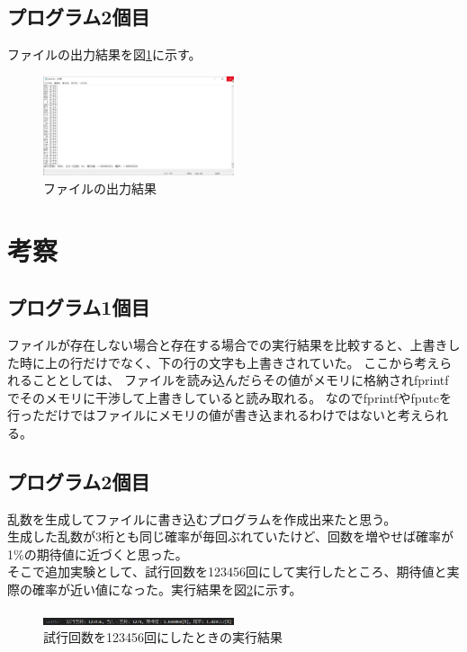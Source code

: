 \documentclass[dvipdfmx]{jsarticle}
\begin{document}
\newpage
\subsection{プログラム2個目}
ファイルの出力結果を図\ref{fig:result_pr2}に示す。\\

\begin{figure}[ht]
  \centering
  \includegraphics[width=0.5\textwidth]{./img/result_pr2.png}
  \caption{ファイルの出力結果}
  \label{fig:result_pr2}
\end{figure}





\section{考察}
\subsection{プログラム1個目}
ファイルが存在しない場合と存在する場合での実行結果を比較すると、上書きした時に上の行だけでなく、下の行の文字も上書きされていた。
ここから考えられることとしては、
ファイルを読み込んだらその値がメモリに格納されfprintfでそのメモリに干渉して上書きしていると読み取れる。
なのでfprintfやfputcを行っただけではファイルにメモリの値が書き込まれるわけではないと考えられる。
\subsection{プログラム2個目}
乱数を生成してファイルに書き込むプログラムを作成出来たと思う。\\
生成した乱数が3桁とも同じ確率が毎回ぶれていたけど、回数を増やせば確率が1\%の期待値に近づくと思った。\\
そこで追加実験として、試行回数を123456回にして実行したところ、期待値と実際の確率が近い値になった。実行結果を図\ref{fig:result_pr2_123456}に示す。\\
\begin{figure}[ht]
  \centering
  \includegraphics[width=0.5\textwidth]{./img/result_pr2_123456.png}
  \caption{試行回数を123456回にしたときの実行結果}
  \label{fig:result_pr2_123456}
\end{figure}
\end{document}
